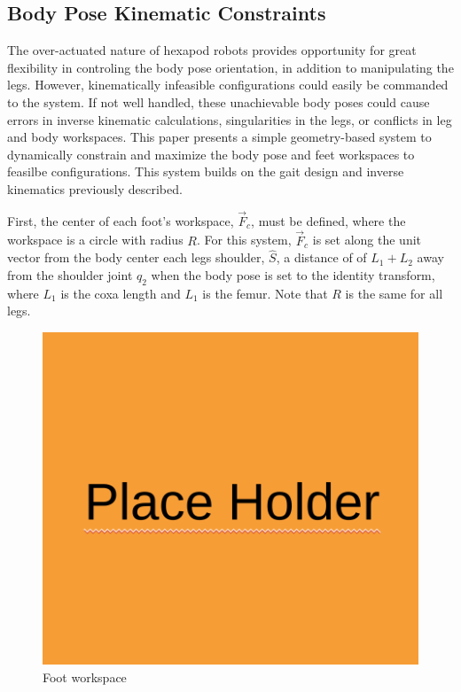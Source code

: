 \subsection{ Body Pose Kinematic Constraints }

The over-actuated nature of hexapod robots provides opportunity for great flexibility in controling the body pose orientation, in addition to manipulating the legs. However, kinematically infeasible configurations could easily be commanded to the system. If not well handled, these unachievable body poses could cause errors in inverse kinematic calculations, singularities in the legs, or conflicts in leg and body workspaces. This paper presents a simple geometry-based system to dynamically constrain and maximize the body pose and feet workspaces to feasilbe configurations. This system builds on the gait design and inverse kinematics previously described. 

First, the center of each foot's workspace, $\vec{F}_c$, must be defined, where the workspace is a circle with radius $R$. For this system, $\vec{F}_c$ is set along the unit vector from the body center each legs shoulder, $\hat{S}$, a distance of of $L_1 + L_2$ away from the shoulder joint $q_2$ when the body pose is set to the identity transform, where $L_1$ is the coxa length and $L_1$ is the femur. Note that $R$ is the same for all legs. 

\begin{figure}[H]
    \centerline{\includegraphics[scale=0.3]{place_holder.png}}
    \caption{Foot workspace}
    \label{fig:foot_workspace}
\end{figure}

